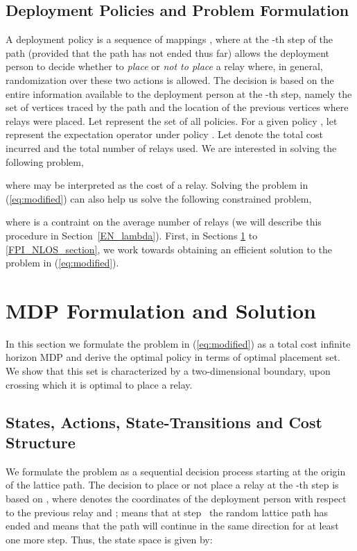 \documentclass[conference]{IEEEtran}
\begin{document}
\subsection{Deployment Policies and Problem Formulation}
A deployment policy  is a sequence of mappings ,
where at the -th step of the path (provided that the path has not
ended thus far)  allows the deployment person to decide whether
to \emph{place} or \emph{not to place} a relay where, in general,
randomization over these two actions is allowed. The decision is based
on the entire information available to the deployment person at the
-th step, namely the set of vertices traced by the path and the
location of the previous vertices where relays were placed.  Let 
represent the set of all policies. For a given policy ,
let  represent the expectation operator under policy
. Let  denote the total cost incurred and  the total number
of relays used. We are interested in solving the following problem,

where  may be interpreted as the cost of a relay.  Solving
the problem in (\ref{eq:modified}) can also help us solve the
following constrained problem,

where  is a contraint on the average number of relays
(we will describe this procedure in Section~\ref{EN_lambda}).
First, in Sections \ref{nlos_section} to \ref{FPI_NLOS_section},
we work towards obtaining an efficient solution to the problem in (\ref{eq:modified}).





\section{MDP Formulation and Solution} 
\label{nlos_section}
In this section we formulate the problem in (\ref{eq:modified}) as a
total cost infinite horizon MDP and derive the optimal policy in terms
of optimal placement set. We show that this set is characterized by a
two-dimensional boundary, upon crossing which it is optimal to place
a relay.


\subsection{States, Actions, State-Transitions and Cost Structure} 
\label{NLOS_MDP}
We formulate the problem as a sequential decision process starting at
the origin of the lattice path. The decision to place or not place a
relay at the -th step is based on , where
 denotes the coordinates of the deployment person with
respect to the previous relay and ;
 means that at step~ the random lattice path has
ended and  means that the path will continue in the
same direction for at least one more step. Thus, the state space is
given by:
\end{document}
